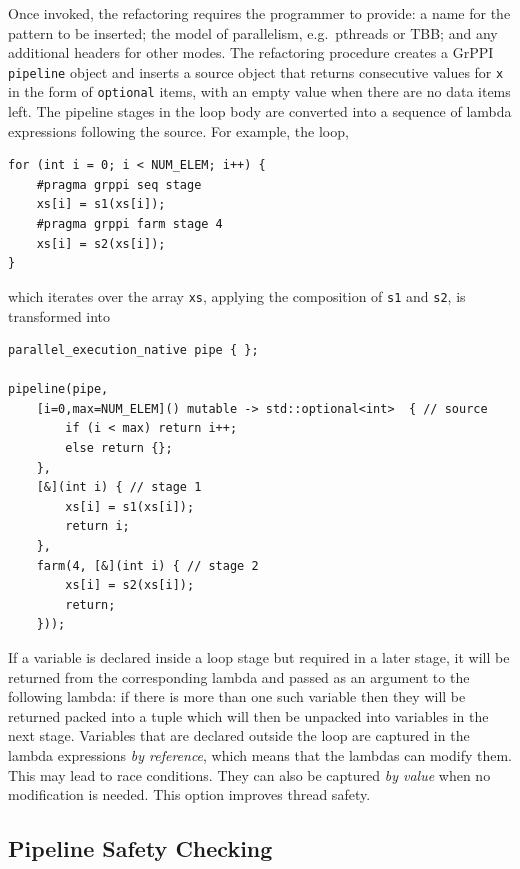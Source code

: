Once invoked, the refactoring requires the programmer to provide: a name for the pattern to be inserted; the model of parallelism, e.g.\ pthreads or TBB; and any additional headers for other modes. 
% 
The refactoring procedure creates a GrPPI \lstinline|pipeline| object and
inserts a source object that returns consecutive values for \texttt{x}
in the form of \texttt{optional} items, with an empty value when there
are no data items left.
% 
The pipeline stages in the loop body are converted into a sequence of
lambda expressions following the source.
% 
For example, the loop,
% 
\begin{lstlisting}
for (int i = 0; i < NUM_ELEM; i++) {
    #pragma grppi seq stage
    xs[i] = s1(xs[i]);
    #pragma grppi farm stage 4
    xs[i] = s2(xs[i]);
}
\end{lstlisting}
% 
\noindent
which iterates over the array \texttt{xs}, applying the composition of \texttt{s1} and \texttt{s2}, is transformed into
% 
\begin{lstlisting}
parallel_execution_native pipe { };

pipeline(pipe,
    [i=0,max=NUM_ELEM]() mutable -> std::optional<int>  { // source
    	if (i < max) return i++;
    	else return {};
    },
    [&](int i) { // stage 1
    	xs[i] = s1(xs[i]);
    	return i;
    },
    farm(4, [&](int i) { // stage 2
    	xs[i] = s2(xs[i]);
    	return;
    }));
\end{lstlisting}
%
If a variable is declared
inside a loop stage but required in a later stage, it will be returned
from the corresponding lambda and passed as an argument to the following
lambda: if there is more than one such variable then they will be
returned packed into a tuple which will then be unpacked into variables
in the next stage.
%
Variables that are declared outside the loop are captured in the lambda
expressions \emph{by reference}, which means that the lambdas can modify
them. This may lead to race conditions. They can also be captured \emph{by value} when no modification is needed. This option improves thread safety.

\subsection{Pipeline Safety Checking}\label{safety-checking}

